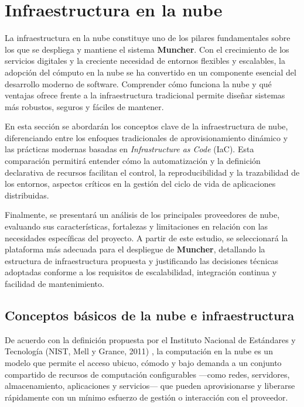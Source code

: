 \section*{Infraestructura en la nube}
{}
\label{sec:infraestructura}

La infraestructura en la nube constituye uno de los pilares fundamentales sobre los que se despliega y mantiene el sistema \textbf{Muncher}. Con el crecimiento de los servicios digitales y la creciente necesidad de entornos flexibles y escalables, la adopción del cómputo en la nube se ha convertido en un componente esencial del desarrollo moderno de software. Comprender cómo funciona la nube y qué ventajas ofrece frente a la infraestructura tradicional permite diseñar sistemas más robustos, seguros y fáciles de mantener.

En esta sección se abordarán los conceptos clave de la infraestructura de nube, diferenciando entre los enfoques tradicionales de aprovisionamiento dinámico y las prácticas modernas basadas en \textit{Infrastructure as Code} (IaC). Esta comparación permitirá entender cómo la automatización y la definición declarativa de recursos facilitan el control, la reproducibilidad y la trazabilidad de los entornos, aspectos críticos en la gestión del ciclo de vida de aplicaciones distribuidas.

Finalmente, se presentará un análisis de los principales proveedores de nube, evaluando sus características, fortalezas y limitaciones en relación con las necesidades específicas del proyecto. A partir de este estudio, se seleccionará la plataforma más adecuada para el despliegue de \textbf{Muncher}, detallando la estructura de infraestructura propuesta y justificando las decisiones técnicas adoptadas conforme a los requisitos de escalabilidad, integración continua y facilidad de mantenimiento.

\subsection*{Conceptos básicos de la nube e infraestructura}

De acuerdo con la definición propuesta por el Instituto Nacional de Estándares y Tecnología (NIST, Mell y Grance, 2011) \cite{Grance2011}, la computación en la nube es un modelo que permite el acceso ubicuo, cómodo y bajo demanda a un conjunto compartido de recursos de computación configurables —como redes, servidores, almacenamiento, aplicaciones y servicios— que pueden aprovisionarse y liberarse rápidamente con un mínimo esfuerzo de gestión o interacción con el proveedor.


